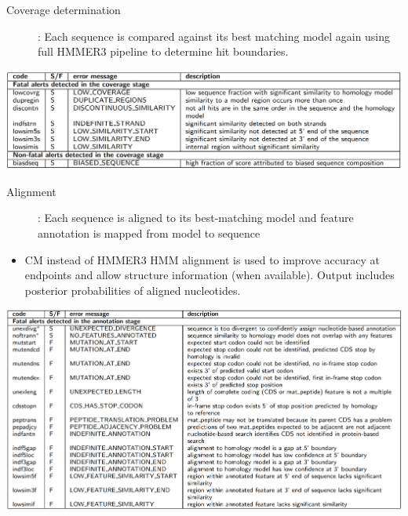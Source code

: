 \documentclass[landscape]{slides}
\begin{document}
\begin{slide}
\begin{center}

\begin{description}
\item[Coverage determination]: Each sequence is compared against
  its best matching model again using full HMMER3 pipeline to
  determine hit boundaries.
\end{description}


\includegraphics[width=10.5in]{figs/ss-coverage-alert-list}

\end{center}
\vfill
\end{slide}
\begin{slide}
\begin{center}

\begin{description}
\item[Alignment]: Each sequence is aligned to its best-matching
  model and feature annotation is mapped from model to sequence
\end{description}

\begin{itemize} 
\item CM instead of HMMER3 HMM alignment is used to improve accuracy
  at endpoints and allow structure information (when available). 
  Output includes posterior probabilities of aligned nucleotides.
\end{itemize}

\includegraphics[width=10.5in]{figs/ss-alignment-alert-list}

\end{center}
\vfill
\end{slide}
\end{document}
